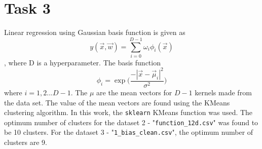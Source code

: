 \documentclass[12pt,a4paper]{article}
\def\tt#1{\texttt{#1}}
\begin{document}
\section{Task 3}
Linear regression using Gaussian basis function is given as 
\begin{equation}
    y(\vec{x},\vec{w}) = \sum_{i=0}^{D-1} \omega_{i}\phi_{i}(\vec{x})
\end{equation},
where D is a hyperparameter. The basis function 
\begin{equation}
    \phi_{i} = \exp\Big(\frac{-|\vec{x} - \vec{\mu}_i|^2}{\sigma^2}\Big)
\end{equation}
where $i = 1,2 ... D-1$. The $\mu$ are the mean vectors for $D-1$ kernels made from the data set. The value of the mean vectors are found using the KMeans clustering algorithm. In this work, the \tt{sklearn} KMeans function was used. The optimum number of clusters for the dataset 2 - "\texttt{function\_12d.csv}" was found to be 10 clusters. For the dataset 3 - "\tt{1\_bias\_clean.csv}", the optimum number of clusters are 9.
\end{document}
